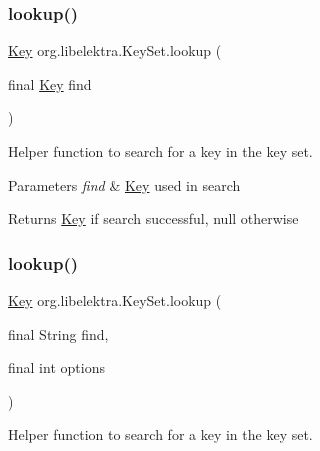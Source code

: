 \subsubsection{\texorpdfstring{lookup()}{lookup()}\hspace{0.1cm}{\footnotesize\ttfamily [2/4]}}
{\footnotesize\ttfamily \hyperlink{classorg_1_1libelektra_1_1Key}{Key} org.\+libelektra.\+Key\+Set.\+lookup (\begin{DoxyParamCaption}\item[{final \hyperlink{classorg_1_1libelektra_1_1Key}{Key}}]{find }\end{DoxyParamCaption})\hspace{0.3cm}{\ttfamily [inline]}}



Helper function to search for a key in the key set. 


\begin{DoxyParams}{Parameters}
{\em find} & \hyperlink{classorg_1_1libelektra_1_1Key}{Key} used in search \\
\hline
\end{DoxyParams}
\begin{DoxyReturn}{Returns}
\hyperlink{classorg_1_1libelektra_1_1Key}{Key} if search successful, null otherwise 
\end{DoxyReturn}
\mbox{\label{classorg_1_1libelektra_1_1KeySet_aa17a04907eb8c8d2a9a488788d0039ea}} 
\subsubsection{\texorpdfstring{lookup()}{lookup()}\hspace{0.1cm}{\footnotesize\ttfamily [3/4]}}
{\footnotesize\ttfamily \hyperlink{classorg_1_1libelektra_1_1Key}{Key} org.\+libelektra.\+Key\+Set.\+lookup (\begin{DoxyParamCaption}\item[{final String}]{find,  }\item[{final int}]{options }\end{DoxyParamCaption})\hspace{0.3cm}{\ttfamily [inline]}}



Helper function to search for a key in the key set. 


